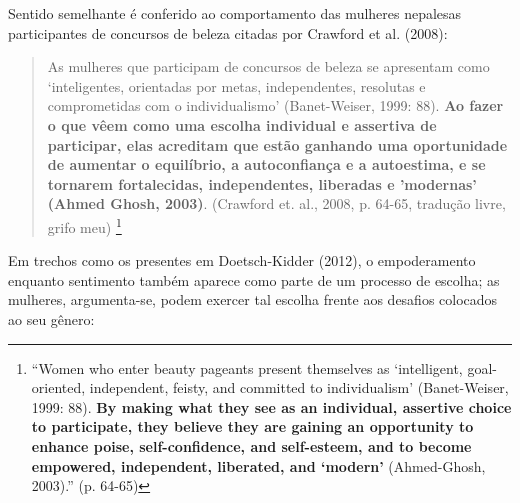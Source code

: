 Sentido semelhante é conferido ao comportamento das mulheres nepalesas participantes de concursos de beleza citadas por Crawford et al. (2008):

\begin{quote}
    As mulheres que participam de concursos de beleza se apresentam como ‘inteligentes, orientadas por metas, independentes, resolutas e comprometidas com o individualismo’ (Banet-Weiser, 1999: 88). \textbf{Ao fazer o que vêem como uma escolha individual e assertiva de participar, elas acreditam que estão ganhando uma oportunidade de aumentar o equilíbrio, a autoconfiança e a autoestima, e se tornarem fortalecidas, independentes, liberadas e 'modernas' (Ahmed Ghosh, 2003)}. (Crawford et. al., 2008, p. 64-65, tradução livre, grifo meu) \footnote{“Women who enter beauty pageants present themselves as ‘intelligent, goal-oriented, independent, feisty, and committed to individualism’ (Banet-Weiser, 1999: 88). \textbf{By making what they see as an individual, assertive choice to participate, they believe they are gaining an opportunity to enhance poise, self-confidence, and self-esteem, and to become empowered, independent, liberated, and ‘modern’} (Ahmed-Ghosh, 2003).” (p. 64-65)}
\end{quote}

Em trechos como os presentes em Doetsch-Kidder (2012), o empoderamento enquanto sentimento também aparece como parte de um processo de escolha; as mulheres, argumenta-se, podem exercer tal escolha frente aos desafios colocados ao seu gênero:

